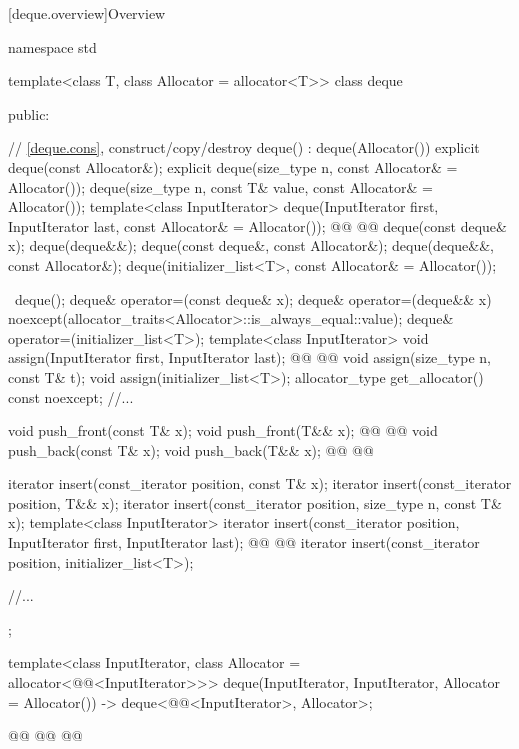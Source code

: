 \documentclass{wg21}
\begin{document}
[deque.overview]{Overview}
\begin{codeblock}
namespace std {
    template<class T, class Allocator = allocator<T>>
    class deque {
        public:

        // \ref{deque.cons}, construct/copy/destroy
        deque() : deque(Allocator()) { }
        explicit deque(const Allocator&);
        explicit deque(size_type n, const Allocator& = Allocator());
        deque(size_type n, const T& value, const Allocator& = Allocator());
        template<class InputIterator>
        deque(InputIterator first, InputIterator last, const Allocator& = Allocator());
        @@
        @@
        deque(const deque& x);
        deque(deque&&);
        deque(const deque&, const Allocator&);
        deque(deque&&, const Allocator&);
        deque(initializer_list<T>, const Allocator& = Allocator());

        ~deque();
        deque& operator=(const deque& x);
        deque& operator=(deque&& x)
        noexcept(allocator_traits<Allocator>::is_always_equal::value);
        deque& operator=(initializer_list<T>);
        template<class InputIterator>
        void assign(InputIterator first, InputIterator last);
        @@
        @@
        void assign(size_type n, const T& t);
        void assign(initializer_list<T>);
        allocator_type get_allocator() const noexcept;
        //...

        void push_front(const T& x);
        void push_front(T&& x);
        @@
        @@
        void push_back(const T& x);
        void push_back(T&& x);
        @@
        @@


        iterator insert(const_iterator position, const T& x);
        iterator insert(const_iterator position, T&& x);
        iterator insert(const_iterator position, size_type n, const T& x);
        template<class InputIterator>
        iterator insert(const_iterator position, InputIterator first, InputIterator last);
        @@
        @@
        iterator insert(const_iterator position, initializer_list<T>);

        //...
    };

    template<class InputIterator, class Allocator = allocator<@@<InputIterator>>>
    deque(InputIterator, InputIterator, Allocator = Allocator())
    -> deque<@@<InputIterator>, Allocator>;

    @@
    @@
    @@
}
\end{codeblock}
\end{document}
